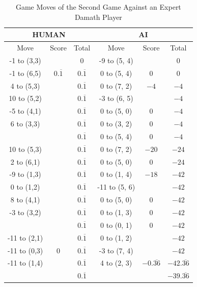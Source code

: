 \begin{appendices}
\begin{table}[H]
    \centering
    \begin{tabular}{cccccc}
        \hline
        \multicolumn{3}{c}{HUMAN}        & \multicolumn{3}{c}{AI}     \\ \hline
        Move         & Score & Total & Move          & Score & Total \\ \hline
          -1 to (3,3) &      &  0    &   -9 to (5, 4) &      &  0    \\ \hline
          -1 to (6,5) & $0.\overline{1}$ &  $0.\overline{1}$  &    0 to (5, 4) & 0      &  0    \\ \hline
          4 to (5,3) &      & $0.\overline{1}$  &    0 to (7, 2) &  $-4$    &  $-4$    \\ \hline
          10 to (5,2) &      &  $0.\overline{1}$    &    -3 to (6, 5) &      &  $-4$    \\ \hline
          -5 to (4,1) &      &  $0.\overline{1}$    &    0 to (5, 0) &  0    &  $-4$    \\ \hline
          6 to (3,3) &      &  $0.\overline{1}$    &    0 to (3, 2) &  0    &  $-4$    \\ \hline
                     &      &  $0.\overline{1}$    &    0 to (5, 4) &  0    &  $-4$    \\ \hline
          10 to (5,3) &      &  $0.\overline{1}$    &    0 to (7, 2) &  $-20$    &  $-24$    \\ \hline
          2 to (6,1) &      &  $0.\overline{1}$    &    0 to (5, 0) &  $0$    &  $-24$    \\ \hline
          -9 to (1,3) &      &  $0.\overline{1}$    &    0 to (1, 4) &  $-18$    &  $-42$    \\ \hline
          0 to (1,2) &      &  $0.\overline{1}$    &    -11 to (5, 6) &      &  $-42$    \\ \hline
          8 to (4,1) &      &  $0.\overline{1}$    &    0 to (5, 0) &  $0$    &  $-42$    \\ \hline
          -3 to (3,2) &      &  $0.\overline{1}$    &    0 to (1, 3) &  $0$    &  $-42$    \\ \hline
                     &      &  $0.\overline{1}$    &    0 to (0, 1) &  $0$    &  $-42$    \\ \hline
          -11 to (2,1) &      &  $0.\overline{1}$    &    0 to (1, 2) &      &  $-42$    \\ \hline
          -11 to (0,3) &  0    &  $0.\overline{1}$    &    -3 to (7, 4) &      &  $-42$    \\ \hline
          -11 to (1,4) &      &  $0.\overline{1}$    &    4 to (2, 3) &  $-0.\overline{36}$    &  $-42.\overline{36}$    \\ \hline \hline
                       &     &   $0.\overline{1}$  &                &          &  $-39.\overline{36}$
    \end{tabular}
    \caption{Game Moves of the Second Game Against an Expert Damath Player}
    \label{tab:second-game}
\end{table}


\end{appendices}
